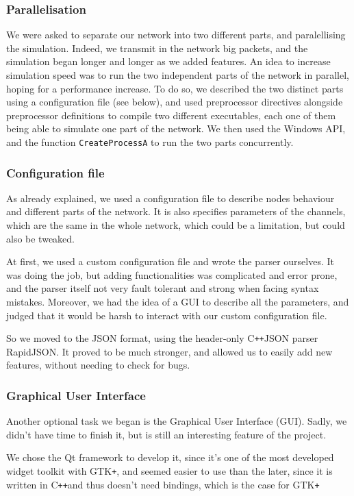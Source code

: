 \documentclass[12pt,a4paper]{article}
\newcommand{\Cpp}{C\texttt{++}}
\begin{document}
\subsubsection*{Parallelisation}
We were asked to separate our network into two different parts, and paralellising the simulation. Indeed, we transmit in the network big packets, and the simulation began longer and longer as we added features. An idea to increase simulation speed was to run the two independent parts of the network in parallel, hoping for a performance increase. To do so, we described the two distinct parts using a configuration file (see below), and used preprocessor directives alongside preprocessor definitions to compile two different executables, each one of them being able to simulate one part of the network. We then used the Windows API, and the function \texttt{CreateProcessA} to run the two parts concurrently.

\subsubsection*{Configuration file}
As already explained, we used a configuration file to describe nodes behaviour and different parts of the network. It is also specifies parameters of the channels, which are the same in the whole network, which could be a limitation, but could also be tweaked.

At first, we used a custom configuration file and wrote the parser ourselves. It was doing the job, but adding functionalities was complicated and error prone, and the parser itself not very fault tolerant and strong when facing syntax mistakes. Moreover, we had the idea of a GUI to describe all the parameters, and judged that it would be harsh to interact with our custom configuration file.

So we moved to the JSON format, using the header-only \Cpp JSON parser RapidJSON. It proved to be much stronger, and allowed us to easily add new features, without needing to check for bugs.

\subsubsection*{Graphical User Interface}
Another optional task we began is the Graphical User Interface (GUI). Sadly, we didn't have time to finish it, but is still an interesting feature of the project.

We chose the Qt framework to develop it, since it's one of the most developed widget toolkit with GTK\texttt{+}, and seemed easier to use than the later, since it is written in \Cpp and thus doesn't need bindings, which is the case for GTK\texttt{+}
\end{document}
